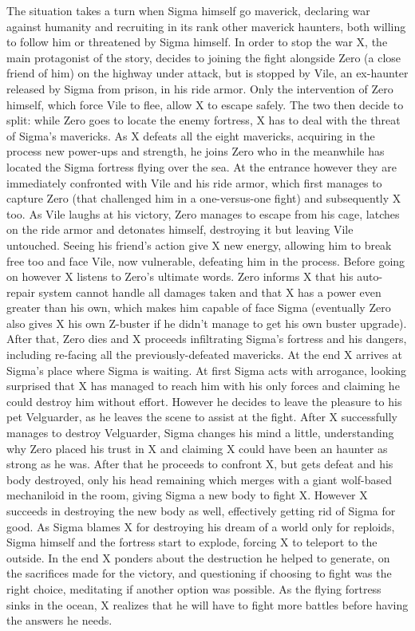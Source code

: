 The situation takes a turn when Sigma himself go maverick, declaring war against humanity and recruiting in its rank other maverick haunters, both willing to follow him or threatened by Sigma himself. In order to stop the war X, the main protagonist of the story, decides to joining the fight alongside Zero (a close friend of him) on the highway under attack, but is stopped by Vile, an ex-haunter released by Sigma from prison, in his ride armor. Only the intervention of Zero himself, which force Vile to flee, allow X to escape safely. The two then decide to split: while Zero goes to locate the enemy fortress, X has to deal with the threat of Sigma's mavericks. As X defeats all the eight mavericks, acquiring in the process new power-ups and strength, he joins Zero who in the meanwhile has located the Sigma fortress flying over the sea. At the entrance however they are immediately confronted with Vile and his ride armor, which first manages to capture Zero (that challenged him in a one-versus-one fight) and subsequently X too. As Vile laughs at his victory, Zero manages to escape from his cage, latches on the ride armor and detonates himself, destroying it but leaving Vile untouched. Seeing his friend's action give X new energy, allowing him to break free too and face Vile, now vulnerable, defeating him in the process. Before going on however X listens to Zero's ultimate words\cite{wiki:MMX_script}. Zero informs X that his auto-repair system cannot handle all damages taken and that X has a power even greater than his own, which makes him capable of face Sigma (eventually Zero also gives X his own Z-buster if he didn't manage to get his own buster upgrade). After that, Zero dies and X proceeds infiltrating Sigma's fortress and his dangers, including re-facing all the previously-defeated mavericks. At the end X arrives at Sigma's place where Sigma is waiting. At first Sigma acts with arrogance, looking surprised that X has managed to reach him with his only forces and claiming he could destroy him without effort. However he decides to leave the pleasure to his pet Velguarder, as he leaves the scene to assist at the fight. After X successfully manages to destroy Velguarder, Sigma changes his mind a little, understanding why Zero placed his trust in X and claiming X could have been an haunter as strong as he was. After that he proceeds to confront X, but gets defeat and his body destroyed, only his head remaining which merges with a giant wolf-based mechaniloid in the room, giving Sigma a new body to fight X. However X succeeds in destroying the new body as well, effectively getting rid of Sigma for good. As Sigma blames X for destroying his dream of a world only for reploids, Sigma himself and the fortress start to explode, forcing X to teleport to the outside. In the end X ponders about the destruction he helped to generate, on the sacrifices made for the victory, and questioning if choosing to fight was the right choice, meditating if another option was possible. As the flying fortress sinks in the ocean, X realizes that he will have to fight more battles before having the answers he needs. 
